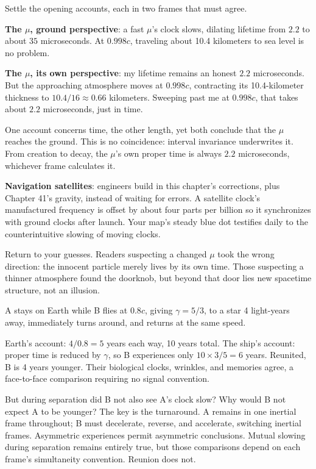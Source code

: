 
\begin{mainline}
Settle the opening accounts, each in two frames that must agree.

\textbf{The \(\mu\), ground perspective}: a fast \(\mu\)'s clock slows, dilating lifetime from \(2.2\) to about \(35\) microseconds. At \(0.998c\), traveling about 10.4 kilometers to sea level is no problem.

\textbf{The \(\mu\), its own perspective}: my lifetime remains an honest \(2.2\) microseconds. But the approaching atmosphere moves at \(0.998c\), contracting its 10.4-kilometer thickness to \(10.4/16\approx 0.66\) kilometers. Sweeping past me at \(0.998c\), that takes about \(2.2\) microseconds, just in time.

One account concerns time, the other length, yet both conclude that the \(\mu\) reaches the ground. This is no coincidence: interval invariance underwrites it. From creation to decay, the \(\mu\)'s own proper time is always \(2.2\) microseconds, whichever frame calculates it.

\textbf{Navigation satellites}: engineers build in this chapter's corrections, plus Chapter 41's gravity, instead of waiting for errors. A satellite clock's manufactured frequency is offset by about four parts per billion so it synchronizes with ground clocks after launch. Your map's steady blue dot testifies daily to the counterintuitive slowing of moving clocks.

Return to your guesses. Readers suspecting a changed \(\mu\) took the wrong direction: the innocent particle merely lives by its own time. Those suspecting a thinner atmosphere found the doorknob, but beyond that door lies new spacetime structure, not an illusion.
\end{mainline}


\begin{thought}
A stays on Earth while B flies at \(0.8c\), giving \(\gamma=5/3\), to a star 4 light-years away, immediately turns around, and returns at the same speed.

Earth's account: \(4/0.8=5\) years each way, 10 years total. The ship's account: proper time is reduced by \(\gamma\), so B experiences only \(10\times 3/5=6\) years. Reunited, B is 4 years younger. Their biological clocks, wrinkles, and memories agree, a face-to-face comparison requiring no signal convention.

But during separation did B not also see A's clock slow? Why would B not expect A to be younger? The key is the turnaround. A remains in one inertial frame throughout; B must decelerate, reverse, and accelerate, switching inertial frames. Asymmetric experiences permit asymmetric conclusions. Mutual slowing during separation remains entirely true, but those comparisons depend on each frame's simultaneity convention. Reunion does not.
\end{thought}

